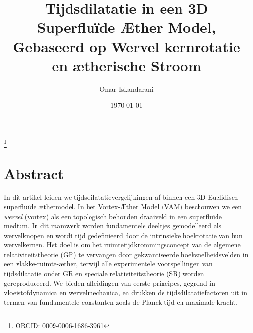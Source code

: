 \documentclass[a4paper,12pt]{revtex4}
\begin{document}
\author{Omar Iskandarani}
\title{Tijdsdilatatie in een 3D Superfluïde Æther Model, Gebaseerd op Wervel kernrotatie en ætherische Stroom}
\date{\today}
\thanks{ORCID: \href{https://orcid.org/0009-0006-1686-3961}{0009-0006-1686-3961}}

\maketitle

\section*{Abstract}
In dit artikel leiden we tijdsdilatatievergelijkingen af binnen een 3D Euclidisch superfluïde æthermodel. In het Vortex-Æther Model (VAM) beschouwen we een \textit{wervel} (vortex) als een topologisch behouden draaiveld in een superfluïde medium. In dit raamwerk worden fundamentele deeltjes gemodelleerd als wervelknopen en wordt tijd gedefinieerd door de intrinsieke hoekrotatie van hun wervelkernen. Het doel is om het ruimtetijdkrommingsconcept van de algemene relativiteitstheorie (GR) te vervangen door gekwantiseerde hoeksnelheidsvelden in een vlakke-ruimte-æther, terwijl alle experimentele voorspellingen van tijdsdilatatie onder GR en speciale relativiteitstheorie (SR) worden gereproduceerd. We bieden afleidingen van eerste principes, gegrond in vloeistofdynamica en wervelmechanica, en drukken de tijdsdilatatiefactoren uit in termen van fundamentele constanten zoals de Planck-tijd en maximale kracht.
\end{document}
